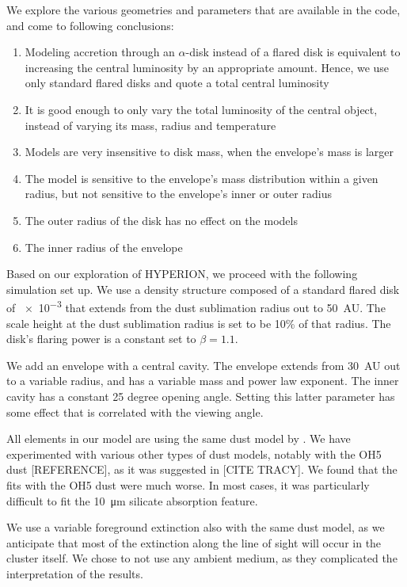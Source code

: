 We explore the various geometries and parameters that are available in the code, and come to following conclusions:
\begin{enumerate}
\item Modeling accretion through an $\alpha$-disk instead of a flared disk is equivalent to increasing the central luminosity by an appropriate amount. Hence, we use only standard flared disks and quote a total central luminosity
\item It is good enough to only vary the total luminosity of the central object, instead of varying its mass, radius and temperature
\item Models are very insensitive to disk mass, when the envelope's mass is larger
\item The model is sensitive to the envelope's mass distribution within a given radius, but not sensitive to the envelope's inner or outer radius
\item The outer radius of the disk has no effect on the models
\item The inner radius of the envelope 
\end{enumerate}

Based on our exploration of HYPERION, we proceed with the following simulation set up. We use a density structure composed of a standard flared disk of \SI{e-3}{\Msun} that extends from the dust sublimation radius out to 50~AU. The scale height at the dust sublimation radius is set to be 10\% of that radius. The disk's flaring power is a constant set to $\beta=1.1$. 

We add an envelope with a central cavity. The envelope extends from 30~AU out to a variable radius, and has a variable mass and power law exponent. The inner cavity has a constant 25 degree opening angle. Setting this latter parameter has some effect that is correlated with the viewing angle.

All elements in our model are using the same dust model by \cite{Draine:2003di}. We have experimented with various other types of dust models, notably with the OH5 dust [REFERENCE], as it was suggested in [CITE TRACY]. We found that the fits with the OH5 dust were much worse. In most cases, it was particularly difficult to fit the \SI{10}{\micro\meter} silicate absorption feature. 

We use a variable foreground extinction also with the same dust model, as we anticipate that most of the extinction along the line of sight will occur in the cluster itself. We chose to not use any ambient medium, as they complicated the interpretation of the results.


